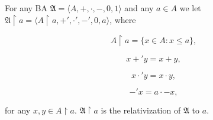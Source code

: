 For any BA $\mathfrak{A} = \langle A, +, \cdot, -, 0, 1 \rangle$ and any $a \in A$ we let $\mathfrak{A} \upharpoonright a = \langle A \upharpoonright a, +', \cdot', -', 0, a \rangle$, where

$$A \upharpoonright a = \{x \in A : x \leq a\},$$

$$x +' y = x + y,$$

$$x \cdot' y = x \cdot y,$$

$$-' x = a \cdot -x,$$

for any $x, y \in A \upharpoonright a$. $\mathfrak{A} \upharpoonright a$ is the relativization of $\mathfrak{A}$ to $a$.
